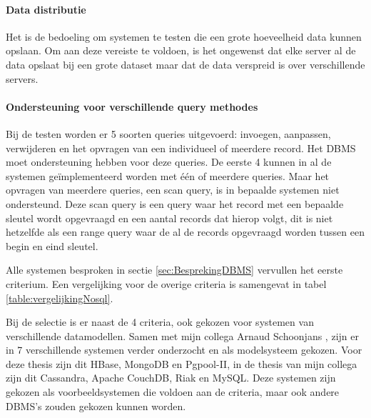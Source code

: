 \paragraph{Data distributie} Het is de bedoeling om systemen te testen die een grote hoeveelheid data kunnen opslaan. Om aan deze vereiste te voldoen, is het ongewenst dat elke server al de data opslaat bij een grote dataset maar dat de data verspreid is over verschillende servers. 

\paragraph{Ondersteuning voor verschillende query methodes} Bij de testen worden er 5 soorten queries uitgevoerd: invoegen, aanpassen, verwijderen en het opvragen van een individueel of meerdere record. Het DBMS moet ondersteuning hebben voor deze queries. De eerste 4 kunnen in al de systemen geïmplementeerd worden met één of meerdere queries. Maar het opvragen van meerdere queries, een scan query, is in bepaalde systemen niet ondersteund. Deze scan query is een query waar het record met een bepaalde sleutel wordt opgevraagd en een aantal records dat hierop volgt, dit is niet hetzelfde als een range query waar de al de records opgevraagd worden tussen een begin en eind sleutel. 

Alle systemen besproken in sectie \ref{sec:BesprekingDBMS} vervullen het eerste criterium. Een vergelijking voor de overige criteria is samengevat in tabel \ref{table:vergelijkingNosql}.

Bij de selectie is er naast de 4 criteria, ook gekozen voor systemen van verschillende datamodellen. Samen met mijn collega Arnaud Schoonjans \cite{thesisArnaud}, zijn er in 7 verschillende systemen verder onderzocht en als modelsysteem gekozen. Voor deze thesis zijn dit HBase, MongoDB en Pgpool-II, in de thesis van mijn collega zijn dit Cassandra, Apache CouchDB, Riak en MySQL. Deze systemen zijn gekozen als voorbeeldsystemen die voldoen aan de criteria, maar ook andere DBMS's zouden gekozen kunnen worden.  
 
